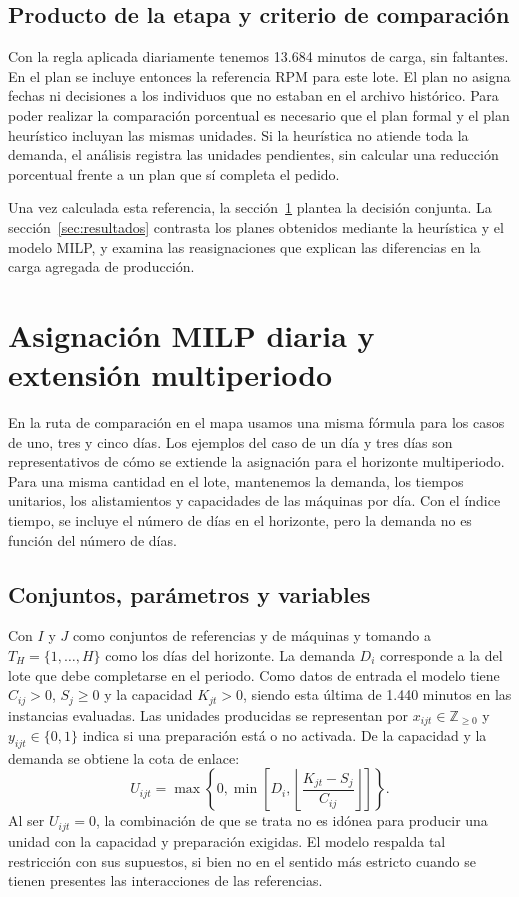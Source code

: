 \documentclass[12pt,a4paper,oneside]{article}
\begin{document}
\subsection{Producto de la etapa y criterio de comparación}
Con la regla aplicada diariamente tenemos 13.684 minutos de carga, sin faltantes. En el plan se incluye entonces la referencia RPM para este lote. El plan no asigna fechas ni decisiones a los individuos que no estaban en el archivo histórico. Para poder realizar la comparación porcentual es necesario que el plan formal y el plan heurístico incluyan las mismas unidades. Si la heurística no atiende toda la demanda, el análisis registra las unidades pendientes, sin calcular una reducción porcentual frente a un plan que sí completa el pedido.

Una vez calculada esta referencia, la sección~\ref{sec:modelo} plantea la decisión conjunta. La sección~\ref{sec:resultados} contrasta los planes obtenidos mediante la heurística y el modelo MILP, y examina las reasignaciones que explican las diferencias en la carga agregada de producción.

\section{Asignación MILP diaria y extensión multiperiodo}\label{sec:modelo}
En la ruta de comparación en el mapa usamos una misma fórmula para los casos de uno, tres y cinco días. Los ejemplos del caso de un día y tres días son representativos de cómo se extiende la asignación para el horizonte multiperiodo. Para una misma cantidad en el lote, mantenemos la demanda, los tiempos unitarios, los alistamientos y capacidades de las máquinas por día. Con el índice tiempo, se incluye el número de días en el horizonte, pero la demanda no es función del número de días.

\subsection{Conjuntos, parámetros y variables}
Con $I$ y $J$ como conjuntos de referencias y de máquinas y tomando a $T_H=\{1,\ldots,H\}$ como los días del horizonte. La demanda $D_i$ corresponde a la del lote que debe completarse en el periodo. Como datos de entrada el modelo tiene $C_{ij}>0$, $S_j\geq0$ y la capacidad $K_{jt}>0$, siendo esta última de 1.440 minutos en las instancias evaluadas. Las unidades producidas se representan por $x_{ijt}\in\mathbb Z_{\geq0}$ y $y_{ijt}\in\{0,1\}$ indica si una preparación está o no activada. De la capacidad y la demanda se obtiene la cota de enlace:
\begin{equation}
U_{ijt}=\max\left\{0,\min\left[D_i,\left\lfloor\frac{K_{jt}-S_j}{C_{ij}}\right\rfloor\right]\right\}.
\label{eq:U}
\end{equation}
Al ser $U_{ijt}=0$, la combinación de que se trata no es idónea para producir una unidad con la capacidad y preparación exigidas. El modelo respalda tal restricción con sus supuestos, si bien no en el sentido más estricto cuando se tienen presentes las interacciones de las referencias.
\end{document}
